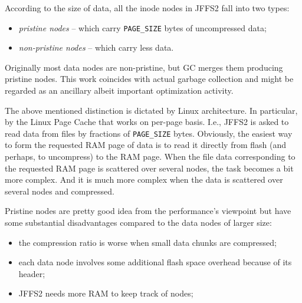 \documentclass[12pt,a4paper,oneside,titlepage]{article}
\begin{document}
According to the size of data, all the inode nodes in JFFS2 fall into
two types:

\begin{itemize}
\item \emph{pristine nodes} -- which carry \texttt{PAGE\_SIZE} bytes of
uncompressed data;

\item \emph{non-pristine nodes} -- which carry less data.
\end{itemize}

Originally most data nodes are non-pristine, but GC merges them
producing pristine nodes. This work coincides with actual garbage
collection and might be regarded as an ancillary albeit important
optimization activity.

The above mentioned distinction is dictated by Linux architecture. In
particular, by the Linux Page Cache that works on per-page basis. I.e.,
JFFS2 is asked to read data from files by fractions of
\texttt{PAGE\_SIZE} bytes. Obviously, the easiest way to form the
requested RAM page of data is to read it directly from flash (and
perhaps, to uncompress) to the RAM page. When the file data
corresponding to the requested RAM page is
scattered over several nodes, the task becomes a bit more complex. And
it is much more complex when the data is scattered over several nodes
and compressed.

Pristine nodes are pretty good idea from the performance's viewpoint
but have some substantial disadvantages compared to the data nodes
of larger size:

\begin{itemize}
\item the compression ratio is worse when small data chunks are compressed;

\item each data node involves some additional flash space overhead
because of its header;

\item JFFS2 needs more RAM to keep track of nodes;
\end{itemize}


%
%
\end{document}
